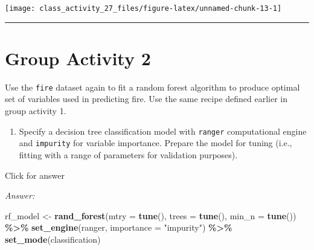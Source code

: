 \documentclass[
]{book}
\newenvironment{Shaded}{\begin{snugshade}}{\end{snugshade}}
\newcommand{\AttributeTok}[1]{\textcolor[rgb]{0.13,0.29,0.53}{#1}}
\newcommand{\ConstantTok}[1]{\textcolor[rgb]{0.56,0.35,0.01}{#1}}
\newcommand{\FunctionTok}[1]{\textcolor[rgb]{0.13,0.29,0.53}{\textbf{#1}}}
\newcommand{\NormalTok}[1]{#1}
\newcommand{\OtherTok}[1]{\textcolor[rgb]{0.56,0.35,0.01}{#1}}
\newcommand{\SpecialCharTok}[1]{\textcolor[rgb]{0.81,0.36,0.00}{\textbf{#1}}}
\newcommand{\StringTok}[1]{\textcolor[rgb]{0.31,0.60,0.02}{#1}}
\providecommand{\tightlist}{%
  \setlength{\itemsep}{0pt}\setlength{\parskip}{0pt}}
\begin{document}
\begin{Shaded}
\end{Shaded}

\texttt{[image: class\_activity\_27\_files/figure-latex/unnamed-chunk-13-1]}

\begin{center}\rule{0.5\linewidth}{0.5pt}\end{center}

\hypertarget{group-activity-2-10}{%
\section{Group Activity 2}\label{group-activity-2-10}}

Use the \texttt{fire} dataset again to fit a random forest algorithm to produce optimal set of variables used in predicting fire. Use the same recipe defined earlier in group activity 1.

\begin{enumerate}
\def\labelenumi{\alph{enumi}.}
\tightlist
\item
  Specify a decision tree classification model with \texttt{ranger} computational engine and \texttt{impurity} for variable importance. Prepare the model for tuning (i.e., fitting with a range of parameters for validation purposes).
\end{enumerate}

Click for answer

\emph{Answer:}

\begin{Shaded}
\begin{Highlighting}[]
\NormalTok{rf\_model }\OtherTok{\textless{}{-}} \FunctionTok{rand\_forest}\NormalTok{(}\AttributeTok{mtry =} \FunctionTok{tune}\NormalTok{(),}
                        \AttributeTok{trees =} \FunctionTok{tune}\NormalTok{(),}
                        \AttributeTok{min\_n =} \FunctionTok{tune}\NormalTok{()) }\SpecialCharTok{\%\textgreater{}\%} 
            \FunctionTok{set\_engine}\NormalTok{(}\StringTok{\textquotesingle{}ranger\textquotesingle{}}\NormalTok{, }\AttributeTok{importance =} \StringTok{"impurity"}\NormalTok{) }\SpecialCharTok{\%\textgreater{}\%} 
            \FunctionTok{set\_mode}\NormalTok{(}\StringTok{\textquotesingle{}classification\textquotesingle{}}\NormalTok{)}
\end{Highlighting}
\end{Shaded}
\end{document}

